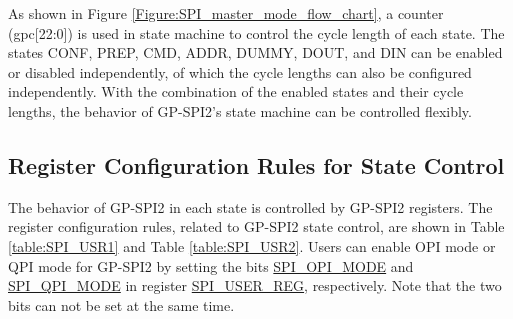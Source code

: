 \documentclass[main\_\_EN.tex]{subfiles}
\begin{document}
As shown in Figure \ref{Figure:SPI_master_mode_flow_chart}, a counter (gpc[22:0]) is used in state machine to control the cycle length of each state. The states CONF, PREP, CMD, ADDR, DUMMY, DOUT, and DIN can be enabled or disabled independently, of which the cycle lengths can also be configured independently. With the combination of the enabled states and their cycle lengths, the behavior of GP-SPI2's state machine can be controlled flexibly.

\subsection{Register Configuration Rules for State Control}\label{GP-SPI2 state and register configuration}

The behavior of GP-SPI2 in each state is controlled by GP-SPI2 registers. The register configuration rules, related to GP-SPI2 state control, are shown in Table \ref{table:SPI_USR1} and Table \ref{table:SPI_USR2}. Users can enable OPI mode or QPI mode for GP-SPI2 by setting the bits \hyperref[fielddesc:SPIOPIMODE]{SPI\_OPI\_MODE} and \hyperref[fielddesc:SPIQPIMODE]{SPI\_QPI\_MODE} in register \hyperref[regdesc:SPIUSERREG]{SPI\_USER\_REG}, respectively. Note that the two bits can not be set at the same time.
\end{document}
